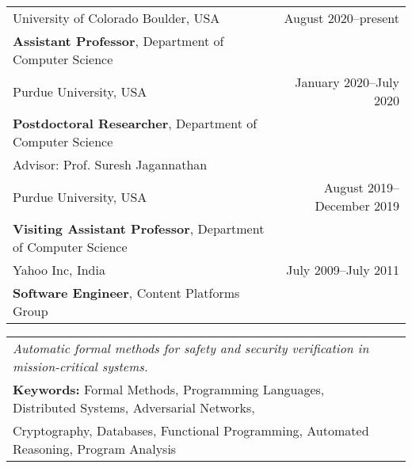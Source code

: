 \documentclass{article}
\begin{document}
\begin{center}
  \begin{tabular}{ p{10cm}  r}
    University of Colorado Boulder, USA  & August 2020--present \\
    {\bf Assistant Professor}, Department of Computer Science &\\[12pt]

    Purdue University, USA & January 2020--July 2020 \\
    {\bf Postdoctoral Researcher}, Department of Computer Science &\\
    Advisor: Prof. Suresh Jagannathan &\\[12pt]

    Purdue University, USA & August 2019--December 2019 \\
    {\bf Visiting Assistant Professor}, Department of Computer Science &\\[12pt]

    Yahoo Inc, India & July 2009--July 2011 \\
    {\bf Software Engineer}, Content Platforms Group &\\[12pt]
    \end{tabular}
\end{center}


\begin{center}
  \begin{tabular}{ l  r }
    \emph{Automatic formal methods for safety and security verification in mission-critical systems.} & \\ [5pt]
{\bf Keywords:} Formal Methods, Programming Languages, Distributed Systems,
Adversarial Networks, &\\
Cryptography, Databases, Functional Programming, Automated Reasoning, Program Analysis&\\ 
\end{tabular}
\end{center}


\vspace{1em}
 
\end{document}
